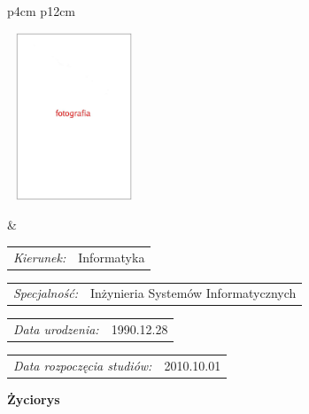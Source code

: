 \begin{titlepage}
\begin{tabular}{p{4cm} p{12cm}}
\begin{minipage}{5cm}
    \includegraphics[height=5cm,width=4cm]{img/foto.jpg}
    \end{minipage}
    &
    \begin{minipage}{12cm}
    \begin{flushleft}
    \par\noindent\vspace{1\baselineskip}
    \begin{tabular}[h]{l l}
    {\normalsize\it Kierunek:} & {\normalsize \hspace{0.8cm} Informatyka}
    \end{tabular}\par\noindent\vspace{1\baselineskip}
    \begin{tabular}[h]{l l}
    {\normalsize\it Specjalność:}& {\normalsize \hspace{0.4cm} Inżynieria Systemów Informatycznych}
    \end{tabular}
    \par\noindent\vspace{1\baselineskip}
    \begin{tabular}[h]{l l}
    {\normalsize\it Data urodzenia:} & {\normalsize \hspace{4.6cm} 1990.12.28}
    \end{tabular}
    \par\noindent\vspace{1\baselineskip}
    \begin{tabular}[h]{l l}
    {\normalsize\it Data rozpoczęcia studiów:} & {\normalsize \hspace{2.8cm} 2010.10.01}
    \end{tabular}
    \par\noindent\vspace{1\baselineskip}
    \end{flushleft}
    \end{minipage}
    \end{tabular}
    \vspace*{1\baselineskip}
    \begin{center}
	{\large\bfseries Życiorys}\par\bigskip
    \end{center}


\end{titlepage}
